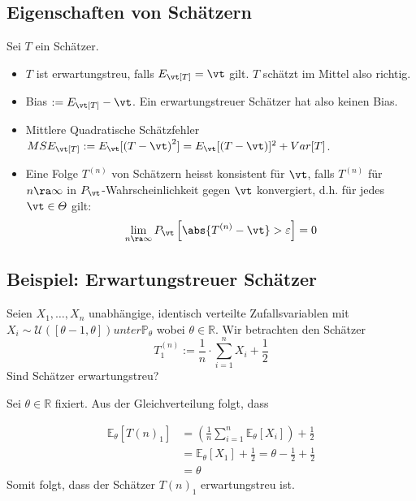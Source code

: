 \subsection{Eigenschaften von Schätzern}
Sei $T$ ein Schätzer.
\begin{itemize}
  \item $T$ ist erwartungstreu, falls $E_\vt[T] = \vt$ gilt. $T$ schätzt
        im Mittel also richtig.
  \item Bias $:= E_\vt[T] - \vt$. Ein erwartungstreuer Schätzer hat also keinen Bias.
  \item Mittlere Quadratische Schätzfehler $MSE_\vt[T] := E_\vt[ {(T - \vt)}^2] = E_\vt[{(T - \vt)}]^2 + Var[T]$.
  \item Eine Folge $T^{ (n)}$ von Schätzern heisst konsistent für $\vt$, falls $T^{
              (n)}$ für $n \ra \infty$ in $P_\vt$-Wahrscheinlichkeit gegen $\vt$ konvergiert,
        d.h. für jedes $\vt \in \varTheta$ gilt:
        \begin{align*}
          \lim_{n \ra \infty} P_\vt \left[ \abs{T^{ (n)} - \vt} > \varepsilon \right] = 0
        \end{align*}
\end{itemize}
\BoxStart{}
\subsection{Beispiel: Erwartungstreuer Schätzer}
Seien $X_1, \ldots, X_n$ unabhängige, identisch verteilte Zufallsvariablen mit $X_i \sim \mathcal{U}([\theta - 1, \theta]) unter \mathbb{P}_\theta$
wobei $\theta \in \mathbb{R}$. Wir betrachten den Schätzer
\[T_1^{(n)} := \frac{1}{n} \cdot \sum_{i = 1}^n X_i + \frac{1}{2}\]
Sind Schätzer erwartungstreu?

Sei $\theta \in \mathbb{R}$ fixiert. Aus der Gleichverteilung folgt, dass

\begin{align*}
  \mathbb{E}_{\theta}[{T(n)}_1] & = \left(\frac{1}{n} \sum_{i=1}^{n} \mathbb{E}_{\theta}[X_i]\right) + \frac{1}{2} \\
                                & = \mathbb{E}_{\theta}[X_1] + \frac{1}{2} = \theta - \frac{1}{2} + \frac{1}{2}    \\
                                & = \theta
\end{align*}
Somit folgt, dass der Schätzer ${T(n)}_1$ erwartungstreu ist.

\BoxEnd{}
